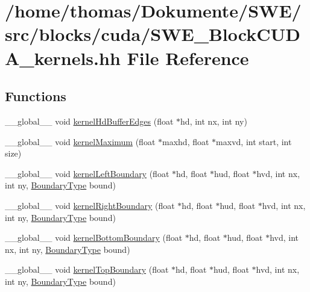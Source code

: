 \hypertarget{SWE__BlockCUDA__kernels_8hh}{\section{/home/thomas/\-Dokumente/\-S\-W\-E/src/blocks/cuda/\-S\-W\-E\-\_\-\-Block\-C\-U\-D\-A\-\_\-kernels.hh File Reference}
\label{SWE__BlockCUDA__kernels_8hh}
}
\subsection*{Functions}
\begin{DoxyCompactItemize}
\item 
\-\_\-\-\_\-global\-\_\-\-\_\- void \hyperlink{SWE__BlockCUDA__kernels_8hh_ad34d42b9197cf6063931cb1bf7c03bd4}{kernel\-Hd\-Buffer\-Edges} (float $\ast$hd, int nx, int ny)
\item 
\-\_\-\-\_\-global\-\_\-\-\_\- void \hyperlink{SWE__BlockCUDA__kernels_8hh_ae810017f0a27a38e1c5d78c7130e8ab4}{kernel\-Maximum} (float $\ast$maxhd, float $\ast$maxvd, int start, int size)
\item 
\-\_\-\-\_\-global\-\_\-\-\_\- void \hyperlink{SWE__BlockCUDA__kernels_8hh_a70e795bea06be7152de387957e090eb3}{kernel\-Left\-Boundary} (float $\ast$hd, float $\ast$hud, float $\ast$hvd, int nx, int ny, \hyperlink{SWE__Scenario_8hh_af75d5dd7322fa39ed0af4e7839e600f8}{Boundary\-Type} bound)
\item 
\-\_\-\-\_\-global\-\_\-\-\_\- void \hyperlink{SWE__BlockCUDA__kernels_8hh_a5b25e2843f0f18a4a5843165ce46054f}{kernel\-Right\-Boundary} (float $\ast$hd, float $\ast$hud, float $\ast$hvd, int nx, int ny, \hyperlink{SWE__Scenario_8hh_af75d5dd7322fa39ed0af4e7839e600f8}{Boundary\-Type} bound)
\item 
\-\_\-\-\_\-global\-\_\-\-\_\- void \hyperlink{SWE__BlockCUDA__kernels_8hh_a776336452fee130d27d02b109a7ab89d}{kernel\-Bottom\-Boundary} (float $\ast$hd, float $\ast$hud, float $\ast$hvd, int nx, int ny, \hyperlink{SWE__Scenario_8hh_af75d5dd7322fa39ed0af4e7839e600f8}{Boundary\-Type} bound)
\item 
\-\_\-\-\_\-global\-\_\-\-\_\- void \hyperlink{SWE__BlockCUDA__kernels_8hh_a655f11967ba2a7ed124b92a9f1400788}{kernel\-Top\-Boundary} (float $\ast$hd, float $\ast$hud, float $\ast$hvd, int nx, int ny, \hyperlink{SWE__Scenario_8hh_af75d5dd7322fa39ed0af4e7839e600f8}{Boundary\-Type} bound)

\end{DoxyCompactItemize}
